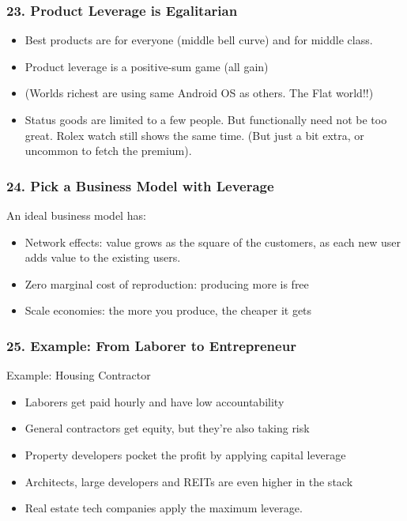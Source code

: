 \begin{frame}[fragile]
\frametitle{23. Product Leverage is Egalitarian}
\begin{itemize}
\item Best products are for everyone (middle bell curve) and for middle class.
\item Product leverage is a positive-sum game (all gain)
\item (Worlds richest are using same Android OS as others. The Flat world!!)
\item Status goods are limited to a few people. But functionally need not be too great. Rolex watch still shows the same time. (But just a bit extra, or uncommon to fetch the premium).
\end{itemize}
\end{frame}

\begin{frame}[fragile]
\frametitle{24. Pick a Business Model with Leverage}
An ideal business model has:
\begin{itemize}
\item Network effects: value grows as the square of the customers, as each new user adds value to the existing users.
\item Zero marginal cost of reproduction: producing more is free
\item Scale economies: the more you produce, the cheaper it gets
\end{itemize}
\end{frame}

\begin{frame}[fragile]
\frametitle{25. Example: From Laborer to Entrepreneur}
Example: Housing Contractor
\begin{itemize}
\item Laborers get paid hourly and have low accountability
\item General contractors get equity, but they're also taking risk
\item Property developers pocket the profit by applying capital leverage
\item Architects, large developers and REITs are even higher in the stack
\item Real estate tech companies apply the maximum leverage.
\end{itemize}
\end{frame}

